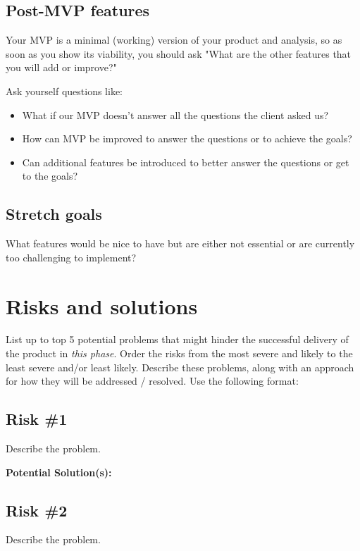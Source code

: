 \documentclass{article}
\begin{document}
\subsection{Post-MVP features}
Your MVP is a minimal (working) version of your product and analysis, so as soon as you show its viability, you should ask "What are the other features that you will add or improve?" 

Ask yourself questions like:
\begin{itemize}
    \item What if our MVP doesn't answer all the questions the client asked us?
    \item How can MVP be improved to answer the questions or to achieve the goals?
    \item Can additional features be introduced to better answer the questions or get to the goals?
\end{itemize}


\subsection{Stretch goals}
What features would be nice to have but are either not essential or are currently too challenging to implement?

\section{Risks and solutions}
   List up to top 5 potential problems that might hinder the successful delivery of the product in \textit{this phase}. 
   Order the risks from the most severe and likely to the least severe and/or least likely.
   Describe these problems, along with an approach for how they will be addressed / resolved.
   Use the following format:
   
   \subsection{Risk \#1}
   Describe the problem.
   
   \textbf{Potential Solution(s): }

   \subsection{Risk \#2}
   Describe the problem.
   
\end{document}
